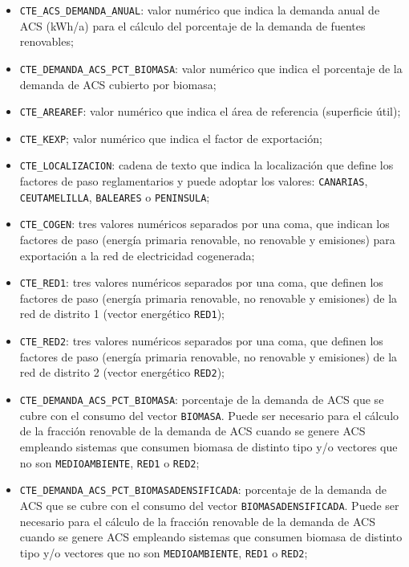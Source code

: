 \documentclass[10pt,notitlepage,oneside,a4paper]{article}
\begin{document}
\begin{itemize}
\item \texttt{CTE\_ACS\_DEMANDA\_ANUAL}: valor numérico que indica la demanda anual de ACS (kWh/a) para el cálculo del porcentaje de la demanda de fuentes renovables;
\item \texttt{CTE\_DEMANDA\_ACS\_PCT\_BIOMASA}: valor numérico que indica el porcentaje de la demanda de ACS cubierto por biomasa;
\item \texttt{CTE\_AREAREF}: valor numérico que indica el área de referencia (superficie útil);
\item \texttt{CTE\_KEXP}; valor numérico que indica el factor de exportación;
\item \texttt{CTE\_LOCALIZACION}: cadena de texto que indica la localización que define los factores de paso reglamentarios y puede adoptar los valores: \texttt{CANARIAS}, \texttt{CEUTAMELILLA}, \texttt{BALEARES} o \texttt{PENINSULA};
\item \texttt{CTE\_COGEN}: tres valores numéricos separados por una coma, que indican los factores de paso (energía primaria renovable, no renovable y emisiones) para exportación a la red de electricidad cogenerada;
\item \texttt{CTE\_RED1}: tres valores numéricos separados por una coma, que definen los factores de paso (energía primaria renovable, no renovable y emisiones) de la red de distrito 1 (vector energético \texttt{RED1});
\item \texttt{CTE\_RED2}: tres valores numéricos separados por una coma, que definen los factores de paso (energía primaria renovable, no renovable y emisiones) de la red de distrito 2 (vector energético \texttt{RED2});
\item \texttt{CTE\_DEMANDA\_ACS\_PCT\_BIOMASA}: porcentaje de la demanda de ACS que se cubre con el consumo del vector \texttt{BIOMASA}. Puede ser necesario para el cálculo de la fracción renovable de la demanda de ACS cuando se genere ACS empleando sistemas que consumen biomasa de distinto tipo y/o vectores que no son \texttt{MEDIOAMBIENTE}, \texttt{RED1} o \texttt{RED2};
\item \texttt{CTE\_DEMANDA\_ACS\_PCT\_BIOMASADENSIFICADA}: porcentaje de la demanda de ACS que se cubre con el consumo del vector \texttt{BIOMASADENSIFICADA}. Puede ser necesario para el cálculo de la fracción renovable de la demanda de ACS cuando se genere ACS empleando sistemas que consumen biomasa de distinto tipo y/o vectores que no son \texttt{MEDIOAMBIENTE}, \texttt{RED1} o \texttt{RED2};
\end{itemize}
\end{document}
